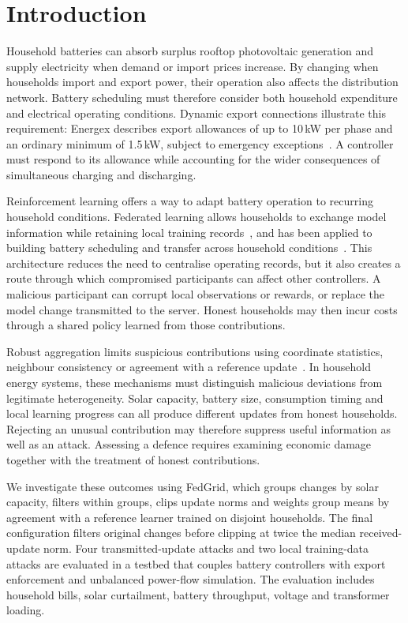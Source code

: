 \documentclass[preprint,12pt,a4paper]{elsarticle}
\begin{document}
\section{Introduction}
\label{sec:introduction}
Household batteries can absorb surplus rooftop photovoltaic generation and supply electricity when demand or import prices increase. By changing when households import and export power, their operation also affects the distribution network. Battery scheduling must therefore consider both household expenditure and electrical operating conditions. Dynamic export connections illustrate this requirement: Energex describes export allowances of up to 10\,kW per phase and an ordinary minimum of 1.5\,kW, subject to emergency exceptions~\cite{energex}. A controller must respond to its allowance while accounting for the wider consequences of simultaneous charging and discharging.

Reinforcement learning offers a way to adapt battery operation to recurring household conditions. Federated learning allows households to exchange model information while retaining local training records~\cite{fedavg}, and has been applied to building battery scheduling and transfer across household conditions~\cite{sievers}. This architecture reduces the need to centralise operating records, but it also creates a route through which compromised participants can affect other controllers. A malicious participant can corrupt local observations or rewards, or replace the model change transmitted to the server. Honest households may then incur costs through a shared policy learned from those contributions.

Robust aggregation limits suspicious contributions using coordinate statistics, neighbour consistency or agreement with a reference update~\cite{yin,krum,fltrust}. In household energy systems, these mechanisms must distinguish malicious deviations from legitimate heterogeneity. Solar capacity, battery size, consumption timing and local learning progress can all produce different updates from honest households. Rejecting an unusual contribution may therefore suppress useful information as well as an attack. Assessing a defence requires examining economic damage together with the treatment of honest contributions.

We investigate these outcomes using FedGrid, which groups changes by solar capacity, filters within groups, clips update norms and weights group means by agreement with a reference learner trained on disjoint households. The final configuration filters original changes before clipping at twice the median received-update norm. Four transmitted-update attacks and two local training-data attacks are evaluated in a testbed that couples battery controllers with export enforcement and unbalanced power-flow simulation. The evaluation includes household bills, solar curtailment, battery throughput, voltage and transformer loading.
\end{document}
